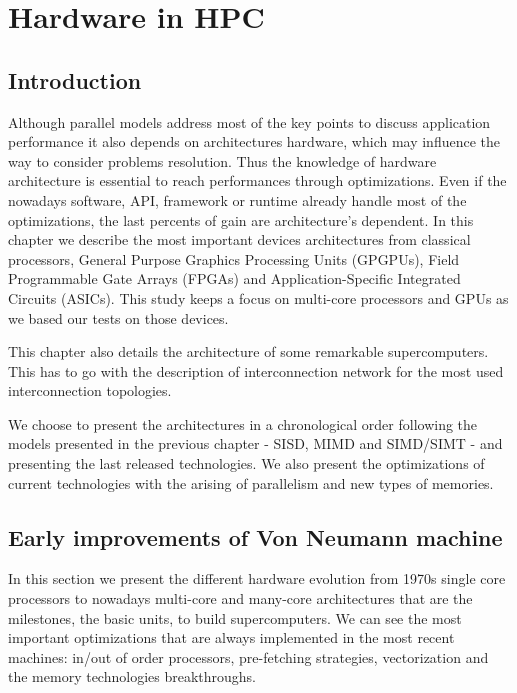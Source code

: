 
\chapter{Hardware in HPC}

\section{Introduction}

Although parallel models address most of the key points to discuss application performance it also depends on architectures hardware, which may influence the way to consider problems resolution. 
Thus the knowledge of hardware architecture is essential to reach performances through optimizations.
Even if the nowadays software, API, framework or runtime already handle most of the optimizations, the last percents of gain are architecture's dependent. 
In this chapter we describe the most important devices architectures from classical processors, General Purpose Graphics Processing Units (GPGPUs), Field Programmable Gate Arrays (FPGAs) and Application-Specific Integrated Circuits (ASICs).
This study keeps a focus on multi-core processors and GPUs as we based our tests on those devices. 

This chapter also details the architecture of some remarkable supercomputers. 
This has to go with the description of interconnection network for the most used interconnection topologies. 

We choose to present the architectures in a chronological order following the models presented in the previous chapter - SISD, MIMD and SIMD/SIMT - and presenting the last released technologies.
We also present the optimizations of current technologies with the arising of parallelism and new types of memories.

\section{Early improvements of Von Neumann machine}
In this section we present the different hardware evolution from 1970s single core processors to nowadays multi-core and many-core architectures that are the milestones, the basic units, to build supercomputers. 
We can see the most important optimizations that are always implemented in the most recent machines: in/out of order processors, pre-fetching strategies, vectorization and the memory technologies breakthroughs. 

